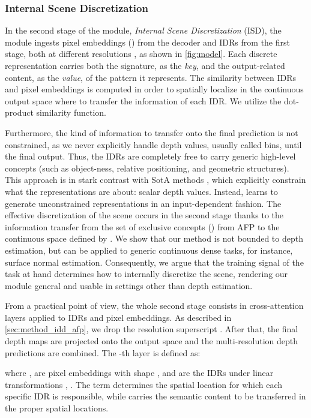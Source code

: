 \subsubsection{Internal Scene Discretization}
\label{sec:method_idd_sd}
In the second stage of the \ourmodule module, \emph{Internal Scene Discretization} (ISD), the module ingests pixel embeddings () from the decoder and IDRs  from the first stage, both at different resolutions , as shown in \cref{fig:model}. Each discrete representation carries both the signature, as the \textit{key}, and the output-related content, as the \textit{value}, of the pattern it represents. The similarity between IDRs and pixel embeddings is computed in order to spatially localize in the continuous output space where to transfer the information of each IDR. We utilize the dot-product similarity function. 

Furthermore, the kind of information to transfer onto the final prediction is not constrained, as we never explicitly handle depth values, usually called bins, until the final output. Thus, the IDRs are completely free to carry generic high-level concepts (such as object-ness, relative positioning, and geometric structures). This approach is in stark contrast with SotA methods \cite{Fu2018, Bhat2020, Li2022DF, Bhat2022}, which explicitly constrain what the representations are about: scalar depth values. Instead, \ourmodel learns to generate unconstrained representations in an input-dependent fashion. The effective discretization of the scene occurs in the second stage thanks to the information transfer from the set of exclusive concepts () from AFP to the continuous space defined by . We show that our method is not bounded to depth estimation, but can be applied to generic continuous dense tasks, for instance, surface normal estimation. Consequently, we argue that the training signal of the task at hand determines how to internally discretize the scene, rendering our \ourmodule module general and usable in settings other than depth estimation.

From a practical point of view, the whole second stage consists in cross-attention layers applied to IDRs and pixel embeddings. As described in \cref{sec:method_idd_afp}, we drop the resolution superscript . After that, the final depth maps are projected onto the output space and the multi-resolution depth predictions are combined. The -th layer is defined as:

where ,  are pixel embeddings with shape , and  are the  IDRs under linear transformations , . The term  determines the spatial location for which each specific IDR is responsible, while  carries the semantic content to be transferred in the proper spatial locations.

